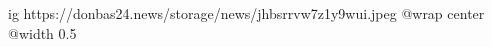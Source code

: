  
 
 
 
 

\ifcmt
  ig https://donbas24.news/storage/news/jhbsrrvw7z1y9wui.jpeg
  @wrap center
  @width 0.5
\fi
